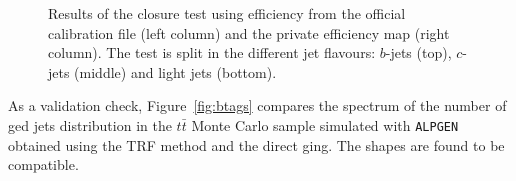 \begin{figure}[h!tb]
\begin{center}
	\caption{Results of the closure test using efficiency from the official calibration file (left column) and the private efficiency map (right column). The test is split in the different jet flavours: $b$-jets (top), $c$-jets (middle) and light jets (bottom).\label{fig:closure}}
\end{center}\end{figure}

As a validation check, Figure~\ref{fig:btags} compares the spectrum
of the number of \btag ged jets distribution in the  $t\bar{t}$ Monte Carlo
sample simulated with \texttt{ALPGEN} obtained using the TRF method
and the direct \btag ging. The shapes are found to be compatible.


